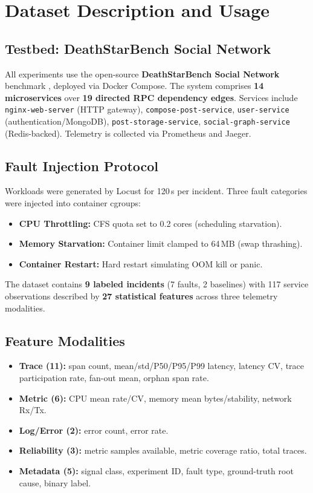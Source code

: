 \documentclass[conference]{IEEEtran}
\begin{document}
\section{Dataset Description and Usage}

\subsection{Testbed: DeathStarBench Social Network}

All experiments use the open-source \textbf{DeathStarBench Social Network} benchmark \cite{gan2019}, deployed via Docker Compose. The system comprises \textbf{14 microservices} over \textbf{19 directed RPC dependency edges}. Services include \texttt{nginx-web-server} (HTTP gateway), \texttt{compose-post-service}, \texttt{user-service} (authentication/MongoDB), \texttt{post-storage-service}, \texttt{social-graph-service} (Redis-backed). Telemetry is collected via Prometheus and Jaeger.

\subsection{Fault Injection Protocol}

Workloads were generated by Locust for 120\,s per incident. Three fault categories were injected into container cgroups:

\begin{itemize}
    \item \textbf{CPU Throttling:} CFS quota set to 0.2 cores (scheduling starvation).
    \item \textbf{Memory Starvation:} Container limit clamped to 64\,MB (swap thrashing).
    \item \textbf{Container Restart:} Hard restart simulating OOM kill or panic.
\end{itemize}

The dataset contains \textbf{9 labeled incidents} (7 faults, 2 baselines) with 117 service observations described by \textbf{27 statistical features} across three telemetry modalities.

\subsection{Feature Modalities}

\begin{itemize}
    \item \textbf{Trace (11):} span count, mean/std/P50/P95/P99 latency, latency CV, trace participation rate, fan-out mean, orphan span rate.
    \item \textbf{Metric (6):} CPU mean rate/CV, memory mean bytes/stability, network Rx/Tx.
    \item \textbf{Log/Error (2):} error count, error rate.
    \item \textbf{Reliability (3):} metric samples available, metric coverage ratio, total traces.
    \item \textbf{Metadata (5):} signal class, experiment ID, fault type, ground-truth root cause, binary label.
\end{itemize}
\end{document}
